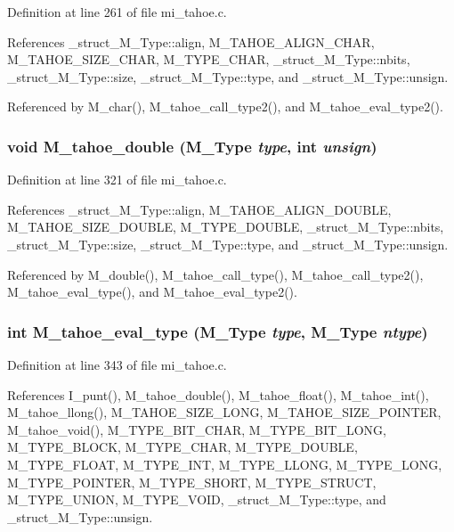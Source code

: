 Definition at line 261 of file mi\_\-tahoe.c.

References \_\-struct\_\-M\_\-Type::align, M\_\-TAHOE\_\-ALIGN\_\-CHAR, M\_\-TAHOE\_\-SIZE\_\-CHAR, M\_\-TYPE\_\-CHAR, \_\-struct\_\-M\_\-Type::nbits, \_\-struct\_\-M\_\-Type::size, \_\-struct\_\-M\_\-Type::type, and \_\-struct\_\-M\_\-Type::unsign.

Referenced by M\_\-char(), M\_\-tahoe\_\-call\_\-type2(), and M\_\-tahoe\_\-eval\_\-type2().
\subsubsection{\setlength{\rightskip}{0pt plus 5cm}void M\_\-tahoe\_\-double (\bf{M\_\-Type} {\em type}, int {\em unsign})}\label{mi__tahoe_8c_1fc682be85697c234eb6afb9fda2b2e1}




Definition at line 321 of file mi\_\-tahoe.c.

References \_\-struct\_\-M\_\-Type::align, M\_\-TAHOE\_\-ALIGN\_\-DOUBLE, M\_\-TAHOE\_\-SIZE\_\-DOUBLE, M\_\-TYPE\_\-DOUBLE, \_\-struct\_\-M\_\-Type::nbits, \_\-struct\_\-M\_\-Type::size, \_\-struct\_\-M\_\-Type::type, and \_\-struct\_\-M\_\-Type::unsign.

Referenced by M\_\-double(), M\_\-tahoe\_\-call\_\-type(), M\_\-tahoe\_\-call\_\-type2(), M\_\-tahoe\_\-eval\_\-type(), and M\_\-tahoe\_\-eval\_\-type2().
\subsubsection{\setlength{\rightskip}{0pt plus 5cm}int M\_\-tahoe\_\-eval\_\-type (\bf{M\_\-Type} {\em type}, \bf{M\_\-Type} {\em ntype})}\label{mi__tahoe_8c_a7478431ced7155d3fc52a21a3f8e811}




Definition at line 343 of file mi\_\-tahoe.c.

References I\_\-punt(), M\_\-tahoe\_\-double(), M\_\-tahoe\_\-float(), M\_\-tahoe\_\-int(), M\_\-tahoe\_\-llong(), M\_\-TAHOE\_\-SIZE\_\-LONG, M\_\-TAHOE\_\-SIZE\_\-POINTER, M\_\-tahoe\_\-void(), M\_\-TYPE\_\-BIT\_\-CHAR, M\_\-TYPE\_\-BIT\_\-LONG, M\_\-TYPE\_\-BLOCK, M\_\-TYPE\_\-CHAR, M\_\-TYPE\_\-DOUBLE, M\_\-TYPE\_\-FLOAT, M\_\-TYPE\_\-INT, M\_\-TYPE\_\-LLONG, M\_\-TYPE\_\-LONG, M\_\-TYPE\_\-POINTER, M\_\-TYPE\_\-SHORT, M\_\-TYPE\_\-STRUCT, M\_\-TYPE\_\-UNION, M\_\-TYPE\_\-VOID, \_\-struct\_\-M\_\-Type::type, and \_\-struct\_\-M\_\-Type::unsign.

